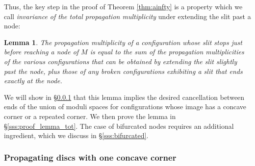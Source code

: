\documentclass[11pt,leqno]{amsart}
\newtheorem{lemma}[theo]{Lemma}
\numberwithin{equation}{section}
\begin{document}

Thus, the key step in the proof of Theorem \ref{thm:ainfty} is a property which we call {\em invariance
of the total propagation multiplicity} under extending the slit past a node:
\begin{lemma}\label{l:tot_mult_invariance}
The propagation
multiplicity of a configuration whose slit stops just before reaching a node of $M$
is equal to the sum of the propagation multiplicities of the various
configurations that can be obtained by extending the slit slightly past the
node, %
plus those of
any broken configurations exhibiting a slit that ends
exactly at the node.
\end{lemma}

\noindent
We will show in \S \ref{sss:concave} that this lemma implies the desired cancellation between ends of the union of
moduli spaces for configurations whose image has a concave corner or 
a repeated corner. We then prove the lemma in \S \ref{sss:proof_lemma_tot}.
The case of bifurcated nodes requires an additional ingredient, which we
discuss in \S \ref{sss:bifurcated}.

\subsubsection{Propagating discs with one concave corner}\label{sss:concave}
\end{document}

